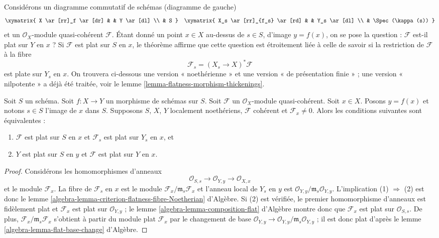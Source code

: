 \noindent
Considérons un diagramme commutatif de schémas (diagramme de gauche)
$$
\xymatrix{
X \ar[rr]_f \ar[dr] & & Y \ar[dl] \\
& S
}
\quad
\xymatrix{
X_s \ar[rr]_{f_s} \ar[rd] & & Y_s \ar[dl] \\
& \Spec(\kappa(s))
}
$$
et un $\mathcal{O}_X$-module quasi-cohérent $\mathcal{F}$.
Étant donné un point $x \in X$ au-dessus de $s \in S$, d'image $y = f(x)$,
on se pose la question : $\mathcal{F}$ est-il plat
sur $Y$ en $x$ ? Si $\mathcal{F}$ est plat sur $S$ en $x$, le
théorème affirme que cette question est étroitement liée à celle
de savoir si la restriction de $\mathcal{F}$ à la fibre
$$
\mathcal{F}_s = (X_s \to X)^*\mathcal{F}
$$
est plate sur $Y_s$ en $x$. On trouvera ci-dessous une version
« noethérienne » et une version « de présentation finie » ; une version
« nilpotente » a déjà été traitée, voir le
lemme \ref{lemma-flatness-morphism-thickenings}.

\begin{theorem}
\label{theorem-criterion-flatness-fibre-Noetherian}
Soit $S$ un schéma.
Soit $f : X \to Y$ un morphisme de schémas sur $S$.
Soit $\mathcal{F}$ un $\mathcal{O}_X$-module quasi-cohérent.
Soit $x \in X$. Posons $y = f(x)$ et notons $s \in S$ l'image de $x$ dans $S$.
Supposons $S$, $X$, $Y$ localement noethériens,
$\mathcal{F}$ cohérent et $\mathcal{F}_x \not = 0$.
Alors les conditions suivantes sont équivalentes :
\begin{enumerate}
\item $\mathcal{F}$ est plat sur $S$ en $x$ et
$\mathcal{F}_s$ est plat sur $Y_s$ en $x$, et
\item $Y$ est plat sur $S$ en $y$ et $\mathcal{F}$ est
plat sur $Y$ en $x$.
\end{enumerate}
\end{theorem}

\begin{proof}
Considérons les homomorphismes d'anneaux
$$
\mathcal{O}_{S, s} \longrightarrow
\mathcal{O}_{Y, y} \longrightarrow \mathcal{O}_{X, x}
$$
et le module $\mathcal{F}_x$. La fibre de $\mathcal{F}_s$ en $x$
est le module $\mathcal{F}_x/\mathfrak m_s \mathcal{F}_x$ et
l'anneau local de $Y_s$ en $y$ est
$\mathcal{O}_{Y, y}/\mathfrak m_s \mathcal{O}_{Y, y}$.
L'implication (1) $\Rightarrow$ (2) est donc le
lemme \ref{algebra-lemma-criterion-flatness-fibre-Noetherian} d'Algèbre.
Si (2) est vérifiée, le premier homomorphisme d'anneaux est fidèlement plat
et $\mathcal{F}_x$ est plat sur $\mathcal{O}_{Y, y}$ ; le
lemme \ref{algebra-lemma-composition-flat} d'Algèbre
montre donc que $\mathcal{F}_x$ est plat sur $\mathcal{O}_{S, s}$.
De plus, $\mathcal{F}_x/\mathfrak m_s \mathcal{F}_x$ s'obtient
à partir du module plat $\mathcal{F}_x$ par le changement de base
$\mathcal{O}_{Y, y} \to \mathcal{O}_{Y, y}/\mathfrak m_s \mathcal{O}_{Y, y}$ ;
il est donc plat d'après le
lemme \ref{algebra-lemma-flat-base-change} d'Algèbre.
\end{proof}

